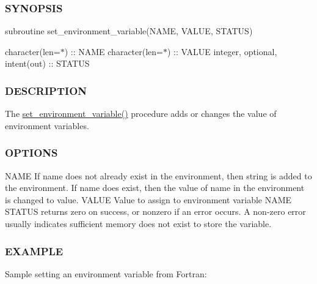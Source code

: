 \subsubsection*{S\+Y\+N\+O\+P\+S\+IS}

subroutine set\+\_\+environment\+\_\+variable(\+N\+A\+M\+E, V\+A\+L\+U\+E, S\+T\+A\+T\+U\+S)

character(len=$\ast$) \+:\+: N\+A\+ME character(len=$\ast$) \+:\+: V\+A\+L\+UE integer, optional, intent(out) \+:\+: S\+T\+A\+T\+US

\subsubsection*{D\+E\+S\+C\+R\+I\+P\+T\+I\+ON}

The \mbox{\hyperlink{namespacem__system_ad813765403a5d9d6fb7a2edcb669fe4b}{set\+\_\+environment\+\_\+variable()}} procedure adds or changes the value of environment variables.

\subsubsection*{O\+P\+T\+I\+O\+NS}

N\+A\+ME If name does not already exist in the environment, then string is added to the environment. If name does exist, then the value of name in the environment is changed to value. V\+A\+L\+UE Value to assign to environment variable N\+A\+ME S\+T\+A\+T\+US returns zero on success, or nonzero if an error occurs. A non-\/zero error usually indicates sufficient memory does not exist to store the variable.

\subsubsection*{E\+X\+A\+M\+P\+LE}

Sample setting an environment variable from Fortran\+:

